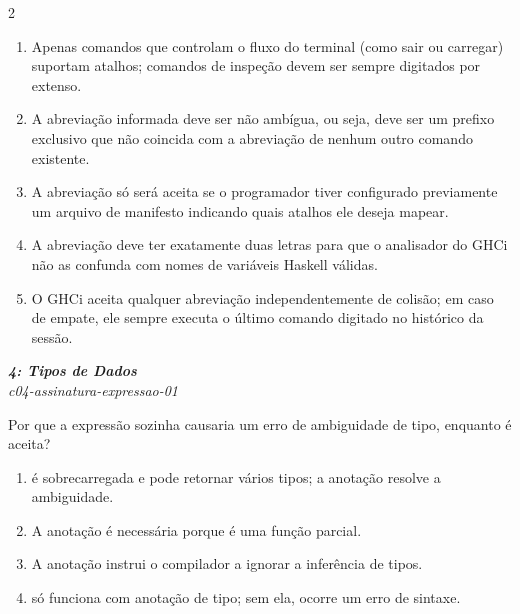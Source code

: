 \documentclass[a4paper,10pt,brazil]{article}
\begin{document}
\begin{multicols}{2}
\begin{enumerate}
  \item Apenas comandos que controlam o fluxo do terminal (como sair ou carregar) suportam atalhos; comandos de inspeção devem ser sempre digitados por extenso.

  \item A abreviação informada deve ser não ambígua, ou seja, deve ser um prefixo exclusivo que não coincida com a abreviação de nenhum outro comando existente.

  \item A abreviação só será aceita se o programador tiver configurado previamente um arquivo de manifesto indicando quais atalhos ele deseja mapear.

  \item A abreviação deve ter exatamente duas letras para que o analisador do GHCi não as confunda com nomes de variáveis Haskell válidas.

  \item O GHCi aceita qualquer abreviação independentemente de colisão; em caso de empate, ele sempre executa o último comando digitado no histórico da sessão.


\end{enumerate}

\begin{flushright}
  \footnotesize
  \textit{\textbf{4: Tipos de Dados}}\\
  \textit{c04-assinatura-expressao-01}\\

\end{flushright}
Por que a expressão  sozinha causaria um erro de ambiguidade de tipo, enquanto  é aceita?

\begin{enumerate}
  \item {} é sobrecarregada e pode retornar vários tipos; a anotação  resolve a ambiguidade.

  \item A anotação é necessária porque  é uma função parcial.

  \item A anotação  instrui o compilador a ignorar a inferência de tipos.

  \item {} só funciona com anotação de tipo; sem ela, ocorre um erro de sintaxe.


\end{enumerate}
\end{multicols}
\end{document}
